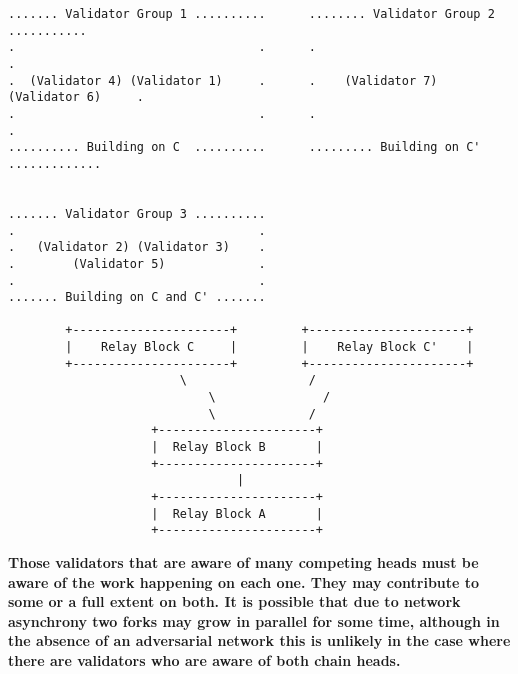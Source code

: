 \begin{verbatim}
....... Validator Group 1 ..........      ........ Validator Group 2 ...........
.                                  .      .                                    .
.  (Validator 4) (Validator 1)     .      .    (Validator 7) (Validator 6)     .
.                                  .      .                                    .
.......... Building on C  ..........      ......... Building on C' .............


....... Validator Group 3 ..........
.                                  .
.   (Validator 2) (Validator 3)    .
.        (Validator 5)             .
.                                  .
....... Building on C and C' .......

        +----------------------+         +----------------------+
        |    Relay Block C     |         |    Relay Block C'    |
        +----------------------+         +----------------------+
                        \                 /
                            \               /
                            \             /
                    +----------------------+
                    |  Relay Block B       |
                    +----------------------+
                                |
                    +----------------------+
                    |  Relay Block A       |
                    +----------------------+
\end{verbatim}

\textbf{Those validators that are aware of many competing heads must be aware of the work happening on each one. They may contribute to some or a full extent on both. It is possible that due to network asynchrony two forks may grow in parallel for some time, although in the absence of an adversarial network this is unlikely in the case where there are validators who are aware of both chain heads.}